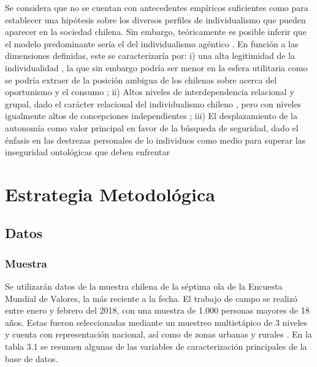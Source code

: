 \documentclass[12pt,twoside]{templates/facsothesis}
\begin{document}
Se considera que no se cuentan con antecedentes empíricos suficientes como para establecer una hipótesis sobre los diversos perfiles de individualismo que pueden aparecer en la sociedad chilena. Sin embargo, teóricamente es posible inferir que el modelo predominante sería el del individualismo agéntico \citep{araujo2014}. En función a las dimensiones definidas, este se caracterizaría por: i) una alta legitimidad de la individualidad \citep{martuccelli2018}, la que sin embargo podría ser menor en la esfera utilitaria como se podría extraer de la posición ambigua de los chilenas sobre acerca del oportunismo \citep{araujo2014} y el consumo \citep{araujo2012}; ii) Altos niveles de interdependencia relacional y grupal, dado el carácter relacional del individualismo chileno \citep{araujo2014}, pero con niveles igualmente altos de concepciones independientes \citep{benavides2020, kolstad2009}; iii) El desplazamiento de la autonomía como valor principal en favor de la búsqueda de seguridad, dado el énfasis en las destrezas personales de lo individuos como medio para superar las inseguridad ontológicas que deben enfrentar \citep{araujo2020a, robles2001}

\hypertarget{estrategia-metodoluxf3gica}{%
\chapter{Estrategia Metodológica}\label{estrategia-metodoluxf3gica}}

\hypertarget{datos}{%
\section{Datos}\label{datos}}

\hypertarget{muestra}{%
\subsection{Muestra}\label{muestra}}

Se utilizarán datos de la muestra chilena de la séptima ola de la Encuesta Mundial de Valores, la más reciente a la fecha. El trabajo de campo se realizó entre enero y febrero del 2018, con una muestra de 1.000 personas mayores de 18 años. Estas fueron seleccionadas mediante un muestreo multietápico de 3 niveles y cuenta con representación nacional, así como de zonas urbanas y rurales \citep{haerpfer2020}. En la tabla 3.1 se resumen algunas de las variables de caracterización principales de la base de datos.
\end{document}
